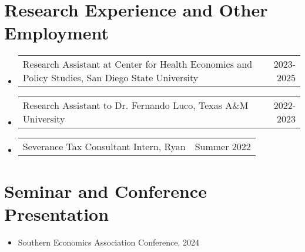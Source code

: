 \documentclass[letterpaper,11pt]{article}
\makeatletter
\newcommand{\resumeSubSubheading}[2]{
    \item
    \begin{tabular*}{0.97\textwidth}{l@{\extracolsep{\fill}}r}
      #1 & #2 \\
    \end{tabular*}\vspace{-7pt}
}
\newcommand{\resumeSubHeadingListStart}{\begin{itemize}[leftmargin=0.15in, label={}]}
\newcommand{\resumeSubHeadingListEnd}{\end{itemize}}
\makeatother
\begin{document}
\section{Research Experience and Other Employment}
    \resumeSubHeadingListStart

      \resumeSubSubheading{Research Assistant at Center for 
      Health Economics and Policy Studies, San Diego State University}{2023-2025}

      \resumeSubSubheading{Research Assistant to Dr. Fernando Luco, Texas 
      A\&M University}{2022-2023}

      \resumeSubSubheading{Severance Tax Consultant Intern, Ryan}{Summer 2022}

    \resumeSubHeadingListEnd

\section{Seminar and Conference Presentation}

    \resumeSubHeadingListStart
    
    \item
    Southern Economics Association Conference, 2024
    
    \resumeSubHeadingListEnd

\end{document}
